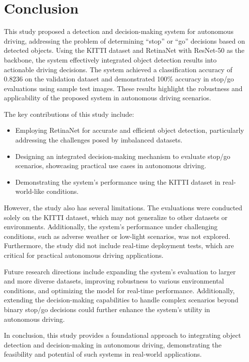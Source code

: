 \documentclass[10pt,twocolumn,letterpaper]{article}
\begin{document}
\section{Conclusion}

This study proposed a detection and decision-making system for autonomous driving, addressing the problem of determining “stop” or “go” decisions based on detected objects. Using the KITTI dataset and RetinaNet with ResNet-50 as the backbone, the system effectively integrated object detection results into actionable driving decisions. The system achieved a classification accuracy of 0.8236 on the validation dataset and demonstrated 100\% accuracy in stop/go evaluations using sample test images. These results highlight the robustness and applicability of the proposed system in autonomous driving scenarios.

The key contributions of this study include:
\begin{itemize}
    \item Employing RetinaNet for accurate and efficient object detection, particularly addressing the challenges posed by imbalanced datasets.
    \item Designing an integrated decision-making mechanism to evaluate stop/go scenarios, showcasing practical use cases in autonomous driving.
    \item Demonstrating the system's performance using the KITTI dataset in real-world-like conditions.
\end{itemize}

However, the study also has several limitations. The evaluations were conducted solely on the KITTI dataset, which may not generalize to other datasets or environments. Additionally, the system's performance under challenging conditions, such as adverse weather or low-light scenarios, was not explored. Furthermore, the study did not include real-time deployment tests, which are critical for practical autonomous driving applications.

Future research directions include expanding the system's evaluation to larger and more diverse datasets, improving robustness to various environmental conditions, and optimizing the model for real-time performance. Additionally, extending the decision-making capabilities to handle complex scenarios beyond binary stop/go decisions could further enhance the system's utility in autonomous driving.

In conclusion, this study provides a foundational approach to integrating object detection and decision-making in autonomous driving, demonstrating the feasibility and potential of such systems in real-world applications.
\end{document}
